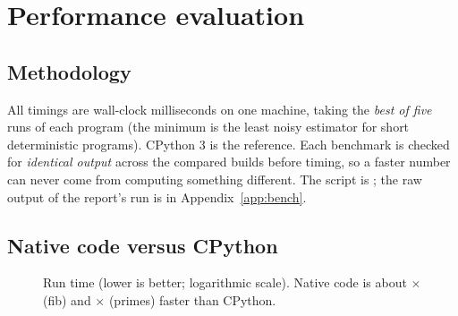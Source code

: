 \chapter{Performance evaluation}
\label{ch:perf}

\section{Methodology}
All timings are wall-clock milliseconds on one machine, taking the \emph{best of five} runs of each program (the minimum is the least noisy estimator for short deterministic programs). CPython 3 is the reference. Each benchmark is checked for \emph{identical output} across the compared builds before timing, so a faster number can never come from computing something different. The script is ; the raw output of the report's run is in Appendix~\ref{app:bench}.

\section{Native code versus CPython}
\begin{table}[H]\centering\small\caption{Native x86-64 code (without and with register allocation) versus CPython. \texttt{fib35} is the doubly-recursive Fibonacci of 35; \texttt{primes} counts primes below 300{,}000 by trial division.}\end{table}

\begin{figure}[H]\centering
{}
\caption{Run time (lower is better; logarithmic scale). Native code is about \BenchFibVspy$\times$ (fib) and \BenchPrimesVspy$\times$ (primes) faster than CPython.}
\end{figure}

